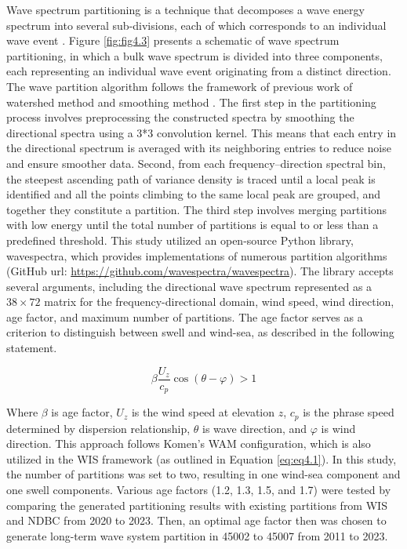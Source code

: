 Wave spectrum partitioning is a technique that decomposes a wave energy spectrum
into several sub-divisions, each of which corresponds to an individual wave
event \citep{portilla-yandun_wave_2015}. Figure \ref{fig:fig4.3} presents a
schematic of wave spectrum partitioning, in which a bulk wave spectrum is
divided into three components, each representing an individual wave event
originating from a distinct direction. The wave partition algorithm follows the
framework of previous work of watershed method \citep{hanson_automated_2001} and
smoothing method \citep{portilla_spectral_2009,portilla-yandun_wave_2015}. The
first step in the partitioning process involves preprocessing the constructed
spectra by smoothing the directional spectra using a 3*3 convolution kernel.
This means that each entry in the directional spectrum is averaged with its
neighboring entries to reduce noise and ensure smoother data. Second, from each
frequency–direction spectral bin, the steepest ascending path of variance
density is traced until a local peak is identified and all the points climbing
to the same local peak are grouped, and together they constitute a partition.
The third step involves merging partitions with low energy until the total
number of partitions is equal to or less than a predefined threshold. This study
utilized an open-source Python library, wavespectra, which provides
implementations of numerous partition algorithms (GitHub url:
\url{https://github.com/wavespectra/wavespectra}).  The library accepts several
arguments, including the directional wave spectrum represented as a $38\times72$
matrix for the frequency-directional domain, wind speed, wind direction, age
factor, and maximum number of partitions. The age factor serves as a criterion
to distinguish between swell and wind-sea, as described in the following
statement.


\begin{equation}
    \beta\frac{U_z}{c_p}\cos(\theta-\varphi) > 1
\label{eq:eq4.5}
\end{equation}

Where $\beta$ is age factor, $U_z$ is the wind speed at elevation $z$, $c_p$ is
the phrase speed determined by dispersion relationship, $\theta$ is wave
direction, and $\varphi$ is wind direction. This approach follows Komen’s WAM
configuration, which is also utilized in the WIS framework (as outlined in
Equation \ref{eq:eq4.1}). In this study, the number of partitions was set to
two, resulting in one wind-sea component and one swell components. Various age
factors (1.2, 1.3, 1.5, and 1.7) were tested by comparing the generated
partitioning results with existing partitions from WIS and NDBC from 2020 to
2023. Then, an optimal age factor then was chosen to generate long-term wave
system partition in 45002 to 45007 from 2011 to 2023. 

